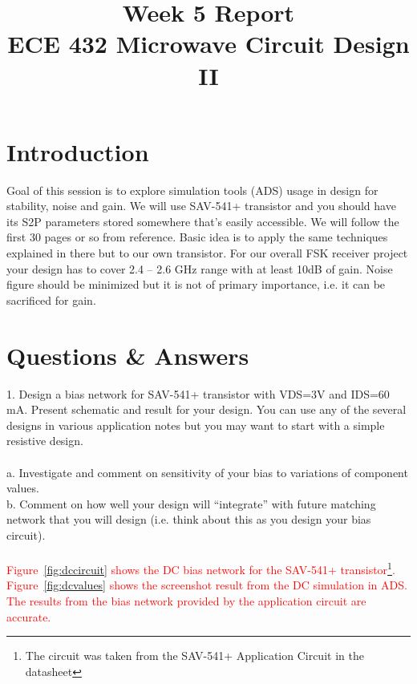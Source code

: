 \documentclass[conference]{IEEEtran}
\begin{document}
\title{Week 5 Report\\ECE 432 Microwave Circuit Design II}
\author{
\and
{}
}
\maketitle
\IEEEpeerreviewmaketitle
\section{Introduction}
Goal of this session is to explore simulation tools (ADS) usage in design for stability, noise and gain. We will use SAV-541+ transistor and you should have its S2P parameters stored somewhere that’s easily accessible. We will follow the first 30 pages or so from reference\cite{payne}. Basic idea is to apply the same techniques explained in there but to our own transistor. For our overall FSK receiver project your design has to cover 2.4 – 2.6 GHz range with at least 10dB of gain. Noise figure should be minimized but it is not of primary importance, i.e. it can be sacrificed for gain.
\section{Questions \& Answers}
1. Design a bias network for SAV-541+ transistor with VDS=3V and IDS=60 mA. Present schematic and result for your design. You can use any of the several designs in various application notes but you may want to start with a simple resistive design.\\\\
a. Investigate and comment on sensitivity of your bias to variations of component values.\\
b. Comment on how well your design will “integrate” with future matching network that you will design (i.e. think about this as you design your bias circuit).\\\\
\textcolor{red}{Figure~\ref{fig:dccircuit} shows the DC bias network for the SAV-541+ transistor\footnote{The circuit was taken from the SAV-541+ Application Circuit in the datasheet}.  Figure~\ref{fig:dcvalues} shows the screenshot result from the DC simulation in ADS.  The results from the bias network provided by the application circuit are accurate.}
\end{document}
